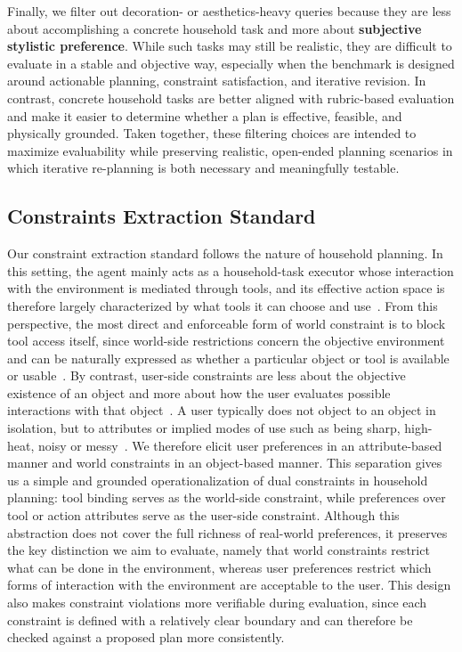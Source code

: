 \documentclass{llmxive}
\begin{document}
Finally, we filter out decoration- or aesthetics-heavy queries because they are less about accomplishing a concrete household task and more about \textbf{subjective stylistic preference}. 
While such tasks may still be realistic, they are difficult to evaluate in a stable and objective way, especially when the benchmark is designed around actionable planning, constraint satisfaction, and iterative revision. 
In contrast, concrete household tasks are better aligned with rubric-based evaluation and make it easier to determine whether a plan is effective, feasible, and physically grounded. 
Taken together, these filtering choices are intended to maximize evaluability while preserving realistic, open-ended planning scenarios in which iterative re-planning is both necessary and meaningfully testable.

\subsection{Constraints Extraction Standard}
\label{app:user-attribute-discussion}

Our constraint extraction standard follows the nature of household planning. 
In this setting, the agent mainly acts as a household-task executor whose interaction with the environment is mediated through tools, and its effective action space is therefore largely characterized by what tools it can choose and use~\citep{shridhar2020alfredbenchmarkinterpretinggrounded,VirtualHome}.
From this perspective, the most direct and enforceable form of world constraint is to block tool access itself, since world-side restrictions concern the objective environment and can be naturally expressed as whether a particular object or tool is available or usable~\citep{Birr_2024,ahn2022icanisay}. 
By contrast, user-side constraints are less about the objective existence of an object and more about how the user evaluates possible interactions with that object~\citep{narcomey2024learninghumanpreferencesrobot,Gerevini2005PlanCA,guo2025mathematical}. 
A user typically does not object to an object in isolation, but to attributes or implied modes of use such as being sharp, high-heat, noisy or messy~\citep{10.1145/3472208,Story2022}. 
We therefore elicit user preferences in an attribute-based manner and world constraints in an object-based manner. 
This separation gives us a simple and grounded operationalization of dual constraints in household planning: tool binding serves as the world-side constraint, while preferences over tool or action attributes serve as the user-side constraint. 
Although this abstraction does not cover the full richness of real-world preferences, it preserves the key distinction we aim to evaluate, namely that world constraints restrict what can be done in the environment, whereas user preferences restrict which forms of interaction with the environment are acceptable to the user. 
This design also makes constraint violations more verifiable during evaluation, since each constraint is defined with a relatively clear boundary and can therefore be checked against a proposed plan more consistently.
\end{document}
